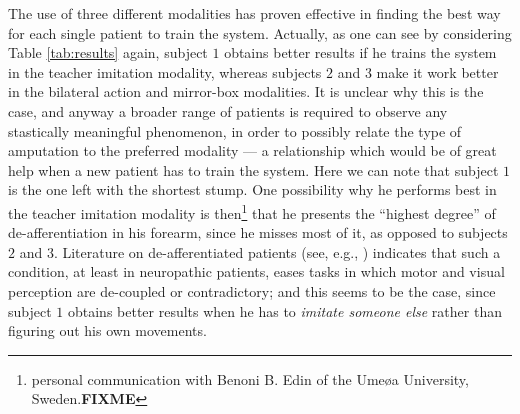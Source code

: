 The use of three different modalities has proven effective in finding
the best way for each single patient to train the system. Actually, as
one can see by considering Table \ref{tab:results} again, subject $1$
obtains better results if he trains the system in the teacher
imitation modality, whereas subjects $2$ and $3$ make it work better
in the bilateral action and mirror-box modalities. It is unclear why
this is the case, and anyway a broader range of patients is required
to observe any stastically meaningful phenomenon, in order to possibly
relate the type of amputation to the preferred modality --- a
relationship which would be of great help when a new patient has to
train the system. Here we can note that subject $1$ is the one left
with the shortest stump. One possibility why he performs best in the
teacher imitation modality is then\footnote{personal communication
with Benoni B. Edin of the Ume\o a University, Sweden.\textbf{FIXME}}
that he presents the ``highest degree'' of de-afferentiation in his
forearm, since he misses most of it, as opposed to subjects $2$ and
$3$. Literature on de-afferentiated patients (see, e.g.,
\cite{...}) indicates that such a condition, at least in neuropathic
patients, eases tasks in which motor and visual perception are
de-coupled or contradictory; and this seems to be the case, since
subject $1$ obtains better results when he has to \emph{imitate
someone else} rather than figuring out his own movements.
